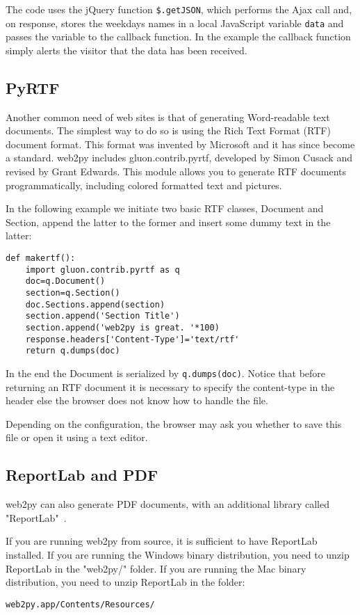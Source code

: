 \documentclass[justified,sixbynine,notoc]{tufte-book}
\def\ft{\small\tt}
\def\inxx#1{\index{#1}}
\begin{document}
\begin{fullwidth}
The code uses the jQuery function {\ft \$.getJSON}, which performs the Ajax call and, on response, stores the weekdays names in a local JavaScript variable {\ft data} and passes the variable to the callback function. In the example the callback function simply alerts the visitor that the data has been received.

\goodbreak\subsection{PyRTF}

\inxx{PyRTF} \inxx{RTF}

Another common need of web sites is that of generating Word-readable text documents. The simplest way to do so is using the Rich Text Format (RTF) document format. This format was invented by Microsoft and it has since become a standard.
\noindent web2py includes gluon.contrib.pyrtf, developed by Simon Cusack and revised by Grant Edwards. This module allows you to generate RTF documents programmatically, including colored formatted text and pictures.

In the following example we initiate two basic RTF classes, Document and Section, append the latter to the former and insert some dummy text in the latter:
\begin{lstlisting}
def makertf():
    import gluon.contrib.pyrtf as q
    doc=q.Document()
    section=q.Section()
    doc.Sections.append(section)
    section.append('Section Title')
    section.append('web2py is great. '*100)
    response.headers['Content-Type']='text/rtf'
    return q.dumps(doc)
\end{lstlisting}

In the end the Document is serialized by {\ft q.dumps(doc)}. Notice that before returning an RTF document it is necessary to specify the content-type in the header else the browser does not know how to handle the file.

Depending on the configuration, the browser may ask you whether to save this file or open it using a text editor.

\goodbreak\subsection{ReportLab and PDF}

\inxx{ReportLab} \inxx{PDF}
\noindent web2py can also generate PDF documents, with an additional library called "ReportLab"~\cite{ReportLab}.

If you are running web2py from source, it is sufficient to have ReportLab installed. If you are running the Windows binary distribution, you need to unzip ReportLab in the "web2py/" folder. If you are running the Mac binary distribution, you need to unzip ReportLab  in the folder:
\begin{lstlisting}
web2py.app/Contents/Resources/
\end{lstlisting}


\end{fullwidth}
\end{document}
